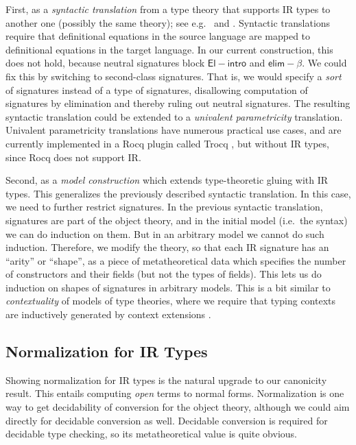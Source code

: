 \documentclass[acmsmall,screen,review]{acmart}
\newcommand{\msf}[1]{{\mathsf{#1}}}
\newcommand{\elim}{\msf{elim}}
\newcommand{\Elintro}{\msf{El\!\!-\!\!intro}}
\newcommand{\elimbeta}{\elim\!-\!\!\beta}
\begin{document}
First, as a \emph{syntactic translation} from a type theory that supports IR types to another one
(possibly the same theory); see e.g.\ \citet{next700} and \citet{bernardy12parametricity}. Syntactic
translations require that definitional equations in the source language are mapped to definitional
equations in the target language. In our current construction, this does not hold, because neutral
signatures block $\Elintro$ and $\elimbeta$. We could fix this by switching to second-class
signatures. That is, we would specify a \emph{sort} of signatures instead of a type of signatures,
disallowing computation of signatures by elimination and thereby ruling out neutral signatures. The
resulting syntactic translation could be extended to a \emph{univalent parametricity} translation.
Univalent parametricity translations have numerous practical use cases, and are currently
implemented in a Rocq plugin called Trocq \cite{cohen2024trocq}, but without IR types, since Rocq
does not support IR.


Second, as a \emph{model construction} which extends type-theoretic gluing with IR types. This
generalizes the previously described syntactic translation. In this case, we need to further
restrict signatures. In the previous syntactic translation, signatures are part of the object
theory, and in the initial model (i.e.\ the syntax) we can do induction on them. But in an arbitrary
model we cannot do such induction. Therefore, we modify the theory, so that each IR signature has
an ``arity'' or ``shape'', as a piece of metatheoretical data which specifies the number of
constructors and their fields (but not the types of fields). This lets us do induction on shapes of
signatures in arbitrary models. This is a bit similar to \emph{contextuality} of models of type
theories, where we require that typing contexts are inductively generated by context extensions
\cite{gat,cwfs}.

\subsection{Normalization for IR Types}

Showing normalization for IR types is the natural upgrade to our canonicity result. This entails
computing \emph{open} terms to normal forms. Normalization is one way to get decidability of
conversion for the object theory, although we could aim directly for decidable conversion as well.
Decidable conversion is required for decidable type checking, so its metatheoretical value is quite
obvious.
\end{document}
